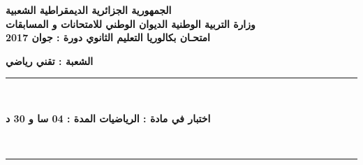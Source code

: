 \documentclass[12pt]{exam}
\newcommand{\alg}{\bf الجمهورية الجزائرية الديمقراطية الشعبية}
\newcommand{\gov}{\bf وزارة التربية الوطنية \hfill   الديوان الوطني للامتحانات و المسابقات}
\newcommand{\bac}{\bf امتحـان بكالوريا التعليم الثانوي 
  \hfill 
   دورة :  
جوان 2017
}
\newcommand{ \duree }{\bf المدة :}
\newcommand{ \niveau }{\bf 
الشعبة : 
تقني رياضي }
\newcommand{ \exam }{\bf اختبار في مادة : }
\begin{document}
 
\begin{center}
\alg  
\\
\gov 
\\
\bac
\end{center}
{\niveau}

\rule{\textwidth}{1.4pt}\\[-2pt]
\centerline{ \exam 
الرياضيات
  \hfill  
\duree 
04 سا و 30 د }\\[-8pt]
\rule{\textwidth}{1.4pt}

\choi   %
\\
\one              %
\vspace{0.6cm}
\end{document}
